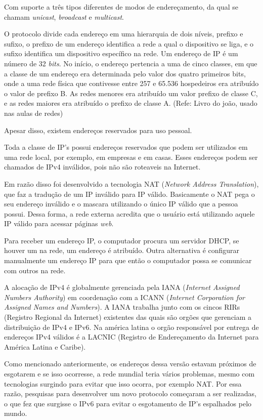 Com suporte a três tipos diferentes de modos de endereçamento, da qual se chamam \textit{unicast}, \textit{broadcast} e \textit{multicast}.

O protocolo divide cada endereço em uma hierarquia de dois níveis, prefixo e sufixo, o prefixo de um endereço identifica a rede a qual o dispositivo se liga, e o sufixo identifica um dispositivo específico na rede. Um endereço de IP é um número de 32 \textit{bits}. No início, o endereço pertencia a uma de cinco classes, em que a classe de um endereço era determinada pelo valor dos quatro primeiros bits, onde a uma rede física que contivesse entre 257 e 65.536 hospedeiros era atribuído o valor de prefixo B. As redes menores era atribuído um valor prefixo de classe C, e as redes maiores era atribuído o prefixo de classe A. (Refe: Livro do joão, usado nas aulas de redes)

Apesar disso, existem endereços reservados para uso pessoal.

Toda a classe de IP's possui endereços reservados que podem ser utilizados em uma rede local, por exemplo, em empresas e em casas. Esses endereços podem ser chamados de IPv4 inválidos, pois não são roteaveis na Internet.

Em razão disso foi desenvolvido a tecnologia NAT (\textit{Network Address Translation}), que faz a tradução de um IP inválido para IP válido. Basicamente o NAT  pega o seu endereço inválido e o mascara utilizando o único IP válido que a pessoa possui. Dessa forma, a rede externa acredita que o usuário está utilizando aquele IP válido para acessar páginas \textit{web}.

Para receber um endereço IP, o computador procura um servidor DHCP, se houver um na rede, um endereço é atribuído. Outra alternativa é configurar manualmente um endereço IP para que então o computador possa se comunicar com outros na rede.

A alocação de IPv4 é globalmente gerenciada pela IANA (\textit{Internet Assigned Numbers Authority}) em coordenação com a ICANN (\textit{Internet Corporation for Assigned Names and Numbers}). A IANA trabalha junto com os cincos RIRs (Registro Regional da Internet) existentes das quais são orgões que gerenciam a distribuição de IPv4 e IPv6. Na américa latina o orgão responsável por entrega de endereços IPv4 válidos é a LACNIC (Registro de Endereçamento da Internet para América Latina e Caribe).

Como mencionado anteriormente, os endereços dessa versão estavam próximos de esgotarem e se isso ocorresse, a rede mundial teria vários problemas, mesmo com tecnologias surgindo para evitar que isso ocorra, por exemplo NAT. Por essa razão, pesquisas para desenvolver um novo protocolo começaram a ser realizadas, o que fez que surgisse o IPv6 para evitar o esgotamento de IP's espalhados pelo mundo.


